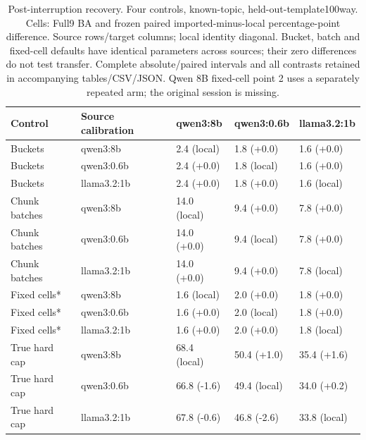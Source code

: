 \begin{table}[t]\centering\fontsize{8}{9.5}\selectfont
\setlength{\tabcolsep}{3pt}
\caption{Post-interruption recovery. Four controls, known-topic, held-out-template100way. Cells: Full9 BA and frozen paired imported-minus-local percentage-point difference. Source rows/target columns; local identity diagonal. Bucket, batch and fixed-cell defaults have identical parameters across sources; their zero differences do not test transfer. Complete absolute/paired intervals and all contrasts retained in accompanying tables/CSV/JSON. Qwen 8B fixed-cell point 2 uses a separately repeated arm; the original session is missing.}
\begin{tabular}{lllll}\toprule
Control & Source calibration & qwen3:8b & qwen3:0.6b & llama3.2:1b\\\midrule
Buckets & qwen3:8b & 2.4 (local) & 1.8 (+0.0) & 1.6 (+0.0)\\
Buckets & qwen3:0.6b & 2.4 (+0.0) & 1.8 (local) & 1.6 (+0.0)\\
Buckets & llama3.2:1b & 2.4 (+0.0) & 1.8 (+0.0) & 1.6 (local)\\
\midrule
Chunk batches & qwen3:8b & 14.0 (local) & 9.4 (+0.0) & 7.8 (+0.0)\\
Chunk batches & qwen3:0.6b & 14.0 (+0.0) & 9.4 (local) & 7.8 (+0.0)\\
Chunk batches & llama3.2:1b & 14.0 (+0.0) & 9.4 (+0.0) & 7.8 (local)\\
\midrule
Fixed cells* & qwen3:8b & 1.6 (local) & 2.0 (+0.0) & 1.8 (+0.0)\\
Fixed cells* & qwen3:0.6b & 1.6 (+0.0) & 2.0 (local) & 1.8 (+0.0)\\
Fixed cells* & llama3.2:1b & 1.6 (+0.0) & 2.0 (+0.0) & 1.8 (local)\\
\midrule
True hard cap & qwen3:8b & 68.4 (local) & 50.4 (+1.0) & 35.4 (+1.6)\\
True hard cap & qwen3:0.6b & 66.8 (-1.6) & 49.4 (local) & 34.0 (+0.2)\\
True hard cap & llama3.2:1b & 67.8 (-0.6) & 46.8 (-2.6) & 33.8 (local)\\
\bottomrule\end{tabular}
\end{table}
